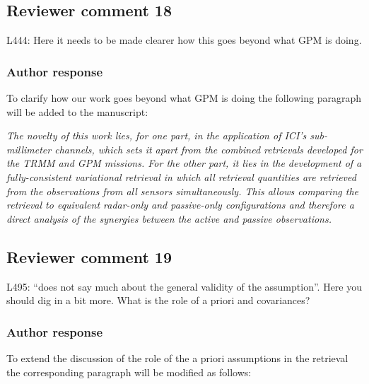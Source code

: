 \documentclass[11pt]{scrartcl}
\begin{document}
\subsection*{Reviewer comment 18}
L444: Here it needs to be made clearer how this goes beyond what GPM is doing.


\subsubsection*{Author response}

To clarify how our work goes beyond what GPM is doing the following paragraph
will be added to the manuscript:

\textit{The novelty of this work lies, for one part, in the application of ICI's
sub-millimeter channels, which sets it apart from the combined retrievals
developed for the TRMM and GPM missions. For the other part, it lies in the
development of a fully-consistent variational retrieval in which all retrieval
quantities are retrieved from the observations from all sensors simultaneously.
This allows comparing the retrieval to equivalent radar-only and passive-only
configurations and therefore a direct analysis of the synergies between the
active and passive observations.}

\subsection*{Reviewer comment 19}
L495:  “does not say much about the general validity of the assumption”.   Here you should dig in a bit more. What is the role of a priori and covariances?

\subsubsection*{Author response}

To extend the discussion of the role of the a priori assumptions in the retrieval
the corresponding paragraph will be modified as follows:
\end{document}
